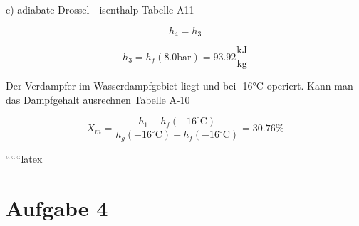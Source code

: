 c) adiabate Drossel - isenthalp Tabelle A11

\[
h_4 = h_3
\]

\[
h_3 = h_f (8.0 \text{bar}) = 93.92 \frac{\text{kJ}}{\text{kg}}
\]

Der Verdampfer im Wasserdampfgebiet liegt und bei -16°C operiert. Kann man das Dampfgehalt ausrechnen Tabelle A-10

\[
X_m = \frac{h_1 - h_f (-16^\circ \text{C})}{h_g (-16^\circ \text{C}) - h_f (-16^\circ \text{C})} = 30.76\%
\]

``````latex


\section*{Aufgabe 4}